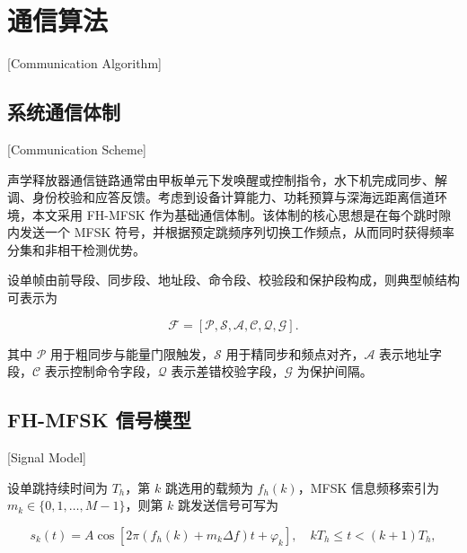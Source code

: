 
%
%

\chapter{通信算法}[Communication Algorithm]
\label{chap03}

\section{系统通信体制}[Communication Scheme]

声学释放器通信链路通常由甲板单元下发唤醒或控制指令，水下机完成同步、解调、身份校验和应答反馈。考虑到设备计算能力、功耗预算与深海远距离信道环境，本文采用 FH-MFSK 作为基础通信体制。该体制的核心思想是在每个跳时隙内发送一个 MFSK 符号，并根据预定跳频序列切换工作频点，从而同时获得频率分集和非相干检测优势\cite{LiBoDuoYongHuShuiShengFHMFSKTongXinJiShuLiLunYuShiXianYanJiu2018,liuFHFSKRemoteControl2021}。

设单帧由前导段、同步段、地址段、命令段、校验段和保护段构成，则典型帧结构可表示为

\begin{equation}
  \mathcal{F}=\left[\mathcal{P},\mathcal{S},\mathcal{A},\mathcal{C},\mathcal{Q},\mathcal{G}\right].
\end{equation}

其中 $\mathcal{P}$ 用于粗同步与能量门限触发，$\mathcal{S}$ 用于精同步和频点对齐，$\mathcal{A}$ 表示地址字段，$\mathcal{C}$ 表示控制命令字段，$\mathcal{Q}$ 表示差错校验字段，$\mathcal{G}$ 为保护间隔。

\section{FH-MFSK 信号模型}[Signal Model]

设单跳持续时间为 $T_h$，第 $k$ 跳选用的载频为 $f_h(k)$，MFSK 信息频移索引为 $m_k \in \{0,1,\ldots,M-1\}$，则第 $k$ 跳发送信号可写为

\begin{equation}
  s_k(t)=A\cos\left[2\pi\left(f_h(k)+m_k\Delta f\right)t+\varphi_k\right],\quad kT_h \leq t < (k+1)T_h,
  \label{eq:fhmfsk_signal}
\end{equation}

